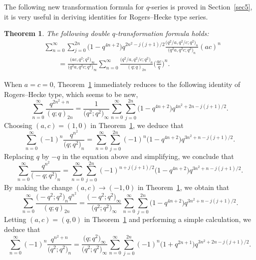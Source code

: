 \documentclass[10pt,a4paper]{amsart}
\numberwithin{equation}{section}
\newtheorem{Theorem}{Theorem}[section]
\begin{document}
 The following new transformation formula for $q$-series is proved in Section~\ref{sec5}, it is very useful in deriving identities for Rogers--Hecke type series.
\begin{Theorem}\label{trianHecke} The following double $q$-transformation formula holds:
\begin{align}
	&\sum_{n=0}^\infty \sum_{j=0}^{2n} \bigl(1-q^{4n+2}\bigr) q^{2n^2-j(j+1)/2}
	\frac{\bigl(q^2/a, q^2/c; q^2\bigr)_n}{\bigl(q^2a, q^2c; q^2\bigr)_n} (ac)^n\nonumber\\
	&\qquad{}=\frac{\bigl(ac, q^2; q^2\bigr)_\infty}{\bigl(q^2a, q^2c; q^2\bigr)_\infty}
	\sum_{n=0}^\infty \frac{\bigl(q^2/a, q^2/c; q^2\bigr)_n}{(q; q)_{2n}}
	\biggl(\frac{ac}{q}\biggr)^n.\label{trinumbers: eqn1}
\end{align}		
\end{Theorem}	
When $a=c=0$, Theorem~\ref{trianHecke} immediately reduces to the following identity of Rogers--Hecke type, which seems to be new,
\begin{equation}\label{trinumbers:eqn2}
\sum_{n=0}^\infty \frac{q^{2n^2+n}}{(q; q)_{2n}}
=\frac{1}{\bigl(q^2; q^2\bigr)_\infty}
\sum_{n=0}^\infty \sum_{j=0}^{2n} \bigl(1-q^{4n+2}\bigr) q^{4n^2+2n-j(j+1)/2}.
\end{equation}
Choosing $(a, c)=(1, 0)$ in Theorem~\ref{trianHecke}, we deduce that
\begin{equation}\label{trinumbers:eqn3}
\sum_{n=0}^\infty (-1)^n \frac{q^{n^2}}{\bigl(q; q^2\bigr)_n}
=\sum_{n=0}^\infty \sum_{j=0}^{2n} (-1)^n \bigl(1-q^{4n+2}\bigr) q^{3n^2+n-j(j+1)/2}.
\end{equation}
Replacing $q$ by $-q$ in the equation above and simplifying, we conclude that
\begin{equation*}%
\sum_{n=0}^\infty \frac{q^{n^2}}{\bigl(-q; q^2\bigr)_n}
=\sum_{n=0}^\infty \sum_{j=0}^{2n} (-1)^{n+j(j+1)/2} \bigl(1-q^{4n+2}\bigr) q^{3n^2+n-j(j+1)/2}.
\end{equation*}
By making the change $(a, c)\to (-1, 0)$ in Theorem~\ref{trianHecke}, we obtain that
\begin{equation*}%
	\sum_{n=0}^\infty \frac{\bigl(-q^2; q^2\bigr)_n q^{n^2}}{(q; q)_{2n}}
	=\frac{\bigl(-q^2; q^2\bigr)_\infty}{\bigl(q^2; q^2\bigr)_\infty} \sum_{n=0}^\infty \sum_{j=0}^{2n} \bigl(1-q^{4n+2}\bigr) q^{3n^2+n-j(j+1)/2}.	
\end{equation*}
Letting $(a, c)=(q, 0)$ in Theorem~\ref{trianHecke} and performing a simple calculation, we deduce that
\begin{equation*}%
\sum_{n=0}^{\infty} (-1)^n \frac{q^{n^2+n}}{\bigl(q^2; q^2\bigr)_n}
=\frac{\bigl(q; q^2\bigr)_\infty}{\bigl(q^2; q^2\bigr)_\infty}
\sum_{n=0}^{\infty}\sum_{j=0}^{2n} (-1)^n \bigl(1+q^{2n+1}\bigr) q^{3n^2+2n-j(j+1)/2}.
\end{equation*}
\end{document}
